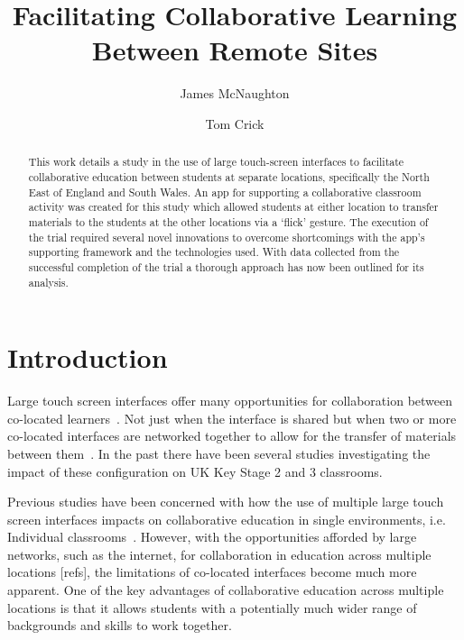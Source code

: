 \documentclass[a4paper,11pt]{article}
\title{Facilitating Collaborative Learning Between Remote Sites}
\author[1]{James McNaughton}
\author[2]{Tom Crick}
\affil[1]{School of Education, Durham University, UK}
\affil[2]{Department of Computing \& Information Systems, Cardiff
  Metropolitan University, UK}
\affil[1]{\protect\url{j.a.mcnaughton@durham.ac.uk}}
\affil[2]{\protect\url{tcrick@cardiffmet.ac.uk}}
\date{ }
\begin{document}
\maketitle


\begin{abstract}
This work details a study in the use of large touch-screen interfaces to facilitate collaborative education between students at separate locations, specifically the North East of England and South Wales.
An app for supporting a collaborative classroom activity was created for this study which allowed students at either location to transfer materials to the students at the other locations via a `flick' gesture.
The execution of the trial required several novel innovations to overcome shortcomings with the app's supporting framework and the technologies used.
With data collected from the successful completion of the trial a thorough approach has now been outlined for its analysis.
\end{abstract}

\section{Introduction}

Large touch screen interfaces offer many opportunities for collaboration between co-located learners~\cite{harris:2009,kharrufa:2013}.
Not just when the interface is shared but when two or more co-located interfaces are networked together to allow for the transfer of materials between them~\cite{kreitmayer:2013,mercier:2013}.
In the past there have been several studies investigating the impact of these configuration on UK Key Stage 2 and 3 classrooms. 


Previous studies have been concerned with how the use of multiple large touch screen interfaces impacts on collaborative education in single environments, i.e. Individual classrooms~\cite{mohammed:2012,kreitmayer:2013,mercier:2015}.
However, with the opportunities afforded by large networks, such as the internet, for collaboration in education across multiple locations [refs], the limitations of co-located interfaces become much more apparent.
One of the key advantages of collaborative education across multiple locations is that it allows students with a potentially much wider range of backgrounds and skills to work together. %
\end{document}
